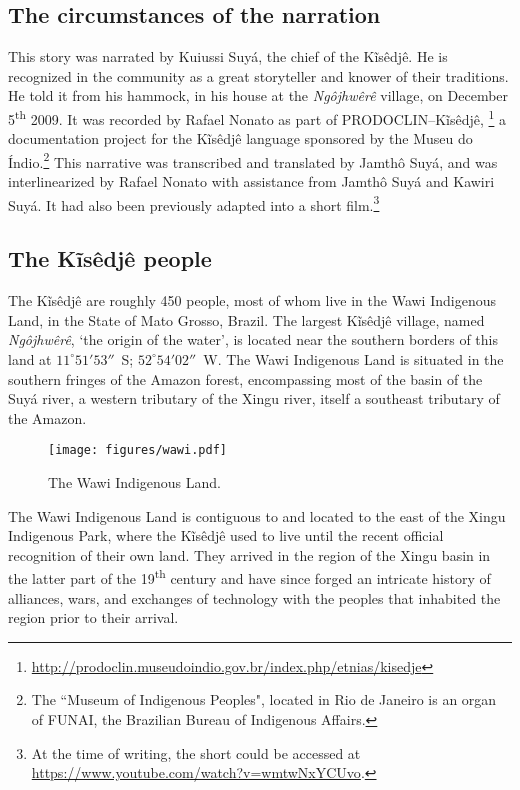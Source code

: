 \documentclass[output=paper,
modfonts,nonflat
]{langsci/langscibook}
\begin{document}
\subsection{The circumstances of the narration} %

This story was narrated by Kuiussi Suyá, the chief of the Kĩsêdjê. He is
recognized in the community as a great storyteller and knower of their
traditions. He told it from his hammock, in his house at the \textit{Ngôjhwêrê} village,
on December 5\textsuperscript{th} 2009. It was recorded by Rafael Nonato as
part of PRODOCLIN--Kĩsêdjê,%
\footnote{\url{http://prodoclin.museudoindio.gov.br/index.php/etnias/kisedje}}
a documentation project for the Kĩsêdjê language sponsored by the Museu do
Índio.\footnote{The “Museum of Indigenous Peoples", located in Rio de Janeiro
is an organ of FUNAI, the Brazilian Bureau of Indigenous Affairs.} This narrative
was transcribed and translated by Jamthô Suyá, and was interlinearized by
Rafael Nonato with assistance from Jamthô Suyá and Kawiri Suyá. It had also
been previously adapted into a short film.\footnote{At the time of writing, the
short could be accessed at \url{https://www.youtube.com/watch?v=wmtwNxYCUvo}.}

\subsection{The Kĩsêdjê people} %

The Kĩsêdjê are roughly 450 people, most of whom live in the Wawi Indigenous
Land, in the State of Mato Grosso, Brazil. The largest Kĩsêdjê village, named
\textit{Ngôjhwêrê}, `the origin of the water', is located near the southern borders of
this land at $11^\circ51'53''$~S; $52^\circ54'02''$~W.\footnotemark{} The Wawi
Indigenous Land is situated in the southern fringes of the Amazon forest,
encompassing most of the basin of the Suyá river, a western tributary of the
Xingu river, itself a southeast tributary of the Amazon. 

\begin{figure}[t]
\texttt{[image: figures/wawi.pdf]}
  \caption{The Wawi Indigenous Land.}
\end{figure}

The Wawi Indigenous
Land is contiguous to and located to the east of the Xingu Indigenous Park,
where the Kĩsêdjê used to live until the recent official recognition of their
own land. They arrived in the region of the Xingu basin in the latter part of
the 19\textsuperscript{th} century and have since forged an intricate history
of alliances, wars, and exchanges of technology with the peoples that inhabited
the region prior to their arrival.%
\end{document}
